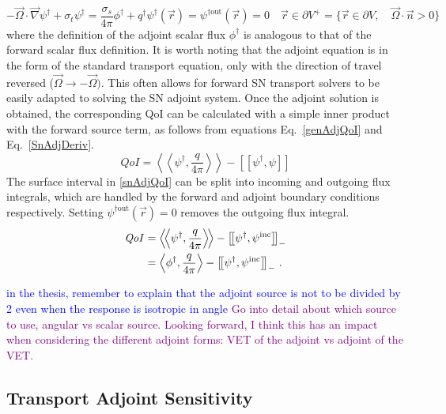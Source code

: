 \documentclass[12pt]{report}
\newcommand{\vr}{\vec{r}}
\newcommand{\vO}{\vec{\Omega}}
\newcommand{\bra}{\left\langle}
\newcommand{\ket}{\right\rangle}
\newcommand{\braSN}{\left\langle \! \left\langle}
\newcommand{\ketSN}{\right\rangle \! \right\rangle}
\newcommand{\sbraSN}{\left[ \! \left[}
\newcommand{\sketSN}{\right] \! \right]}
\newcommand{\grad}{\vec{\nabla}}
\newcommand{\bound}{\partial V}
\newcommand{\sigt}{\sigma_t}
\newcommand{\sigs}{\sigma_s}
\newcommand{\angSource}{\frac{q}{4 \pi}}
\newcommand{\scalResp}{q^\dag}
\newcommand{\qoi}{{\it QoI}\xspace}
\newcommand{\comment}[2]{\marginpar{\textcolor{#2}{$\star$}}\textcolor{#2}{#1}\newline}
\newcommand{\jcr}[1]{\comment{#1}{blue}}
\newcommand{\todo}[1]{\comment{#1}{purple}}
\newcommand{\jcr}[1]{\phantom{a}}
\newcommand{\todo}[1]{\phantom{a}}
\begin{document}
\begin{subequations}
\begin{equation}
\label{anAdj}
- \vO \cdot \grad \psi^\dag + \sigt \psi^\dag = \frac{\sigs}{4 \pi} \phi^\dag + \scalResp
\end{equation}
\begin{equation}
\psi^\dag(\vr) = \psi^{\dag \text{out}}(\vr)=0 \quad \vr \in \partial V^{+} = \{  \vr \in \bound , \quad \vO \cdot \vec{n} > 0 \}
\end{equation}
\end{subequations}
where the definition of the adjoint scalar flux $\phi^\dag$ is analogous to that of 
the forward scalar flux definition. It is worth noting that the adjoint equation is in the form of the standard transport equation, only with the direction of travel reversed ($\vO \to -\vO)$. This often allows for forward SN transport solvers to be easily adapted to solving the SN adjoint system. Once the adjoint solution is obtained, the corresponding QoI can be calculated with a simple inner product with the forward source term, as follows from equations Eq.~\eqref{genAdjQoI} and Eq.~\eqref{SnAdjDeriv}. %
\begin{equation}
\label{snAdjQoI}
QoI = \braSN \psi^\dag , \angSource \ketSN - \sbraSN \psi^\dag,  \psi \sketSN
\end{equation}
%
The surface interval in \eqref{snAdjQoI} can be split into incoming and outgoing flux integrals, which are handled by the forward and adjoint boundary conditions respectively. Setting $\psi^{\dag \text{out}}(\vr)=0$ removes the outgoing flux integral.
%
\begin{equation}
\label{snAdjQoIBCsplit}
\begin{split}
\qoi &= \braSN \psi^\dag , \angSource \ketSN - \sbraSN \psi^\dag,  \psi^{\text{inc}} \sketSN_- \\
&= \bra \phi^\dag , \angSource \ket - \sbraSN \psi^\dag,  \psi^{\text{inc}} \sketSN_- \,.
\end{split}
\end{equation}

\jcr{in the thesis, remember to explain that the adjoint source is not to be divided by 2 even when the response is isotropic in angle}
\todo{Go into detail about which source to use, angular vs scalar source. Looking forward, I think this has an impact when considering the different adjoint forms: VET of the adjoint vs adjoint of the VET.}
\subsection{Transport Adjoint Sensitivity}
\end{document}
